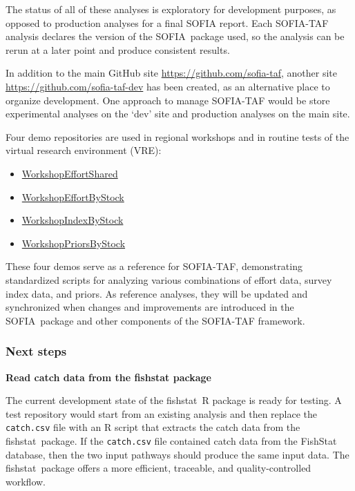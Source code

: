 \documentclass[12pt]{article}
\newcommand\blue[1]{\textcolor{darkblue}{#1}}
\newcommand\fishstat{{\sf fishstat}}
\newcommand\SOFIA{{\sf SOFIA}}
\newcommand\sofialink[2]{\blue{\href{https://github.com/sofia-taf/#1}{\sf #2}}}
\begin{document}
The status of all of these analyses is exploratory for development purposes, as
opposed to production analyses for a final SOFIA report. Each SOFIA-TAF analysis
declares the version of the \SOFIA\ package used, so the analysis can be rerun
at a later point and produce consistent results.

In addition to the main GitHub site \blue{\url{https://github.com/sofia-taf}},
another site \blue{\url{https://github.com/sofia-taf-dev}} has been created, as
an alternative place to organize development. One approach to manage SOFIA-TAF
would be store experimental analyses on the `dev' site and production analyses
on the main site.

Four demo repositories are used in regional workshops and in routine tests of
the virtual research environment (VRE):

\begin{itemize}
  \item \sofialink{WorkshopEffortShared}{WorkshopEffortShared}
  \item \sofialink{WorkshopEffortByStock}{WorkshopEffortByStock}
  \item \sofialink{WorkshopIndexByStock}{WorkshopIndexByStock}
  \item \sofialink{WorkshopPriorsByStock}{WorkshopPriorsByStock}
\end{itemize}

These four demos serve as a reference for SOFIA-TAF, demonstrating standardized
scripts for analyzing various combinations of effort data, survey index data,
and priors. As reference analyses, they will be updated and synchronized when
changes and improvements are introduced in the \SOFIA\ package and other
components of the SOFIA-TAF framework.

\subsubsection{Next steps}
\label{subsubsec:repos-next-steps}

\textbf{Read catch data from the fishstat package}

The current development state of the \fishstat\ R package is ready for testing.
A test repository would start from an existing analysis and then replace the
\verb|catch.csv| file with an R script that extracts the catch data from the
\fishstat\ package. If the \verb|catch.csv| file contained catch data from the
FishStat database, then the two input pathways should produce the same input
data. The \fishstat\ package offers a more efficient, traceable, and
quality-controlled workflow.\\[-2ex]
\end{document}
